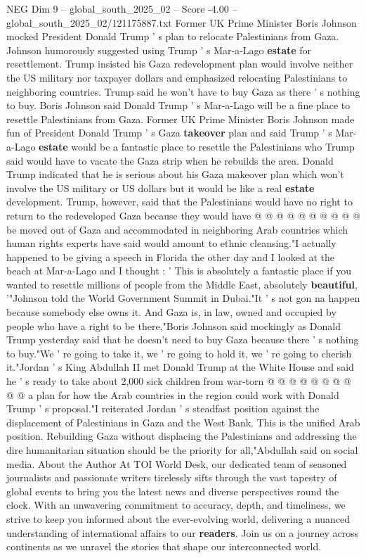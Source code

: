 \begin{textsample}{NEG Dim 9 – global\_south\_2025\_02 – Score -4.00 – global\_south\_2025\_02/121175887.txt}  \label{ex:f9_neg_060}
Former UK Prime Minister Boris Johnson mocked President Donald Trump ' s plan to relocate Palestinians from Gaza.
Johnson humorously suggested using Trump ' s Mar-a-Lago \textbf{estate} for resettlement.
Trump insisted his Gaza redevelopment plan would involve neither the US military nor taxpayer dollars and emphasized relocating Palestinians to neighboring countries.
Trump said he won't have to buy Gaza as there ' s nothing to buy.
Boris Johnson said Donald Trump ' s Mar-a-Lago will be a fine place to resettle Palestinians from Gaza.
Former UK Prime Minister Boris Johnson made fun of President Donald Trump ' s Gaza \textbf{takeover} plan and said Trump ' s Mar-a-Lago \textbf{estate} would be a fantastic place to resettle the Palestinians who Trump said would have to vacate the Gaza strip when he rebuilds the area.
Donald Trump indicated that he is serious about his Gaza makeover plan which won't involve the US military or US dollars but it would be like a real \textbf{estate} development.
Trump, however, said that the Palestinians would have no right to return to the redeveloped Gaza because they would have @ @ @ @ @ @ @ @ @ @ be moved out of Gaza and accommodated in neighboring Arab countries which human rights experts have said would amount to ethnic cleansing."I actually happened to be giving a speech in Florida the other day and I looked at the beach at Mar-a-Lago and I thought : ' This is absolutely a fantastic place if you wanted to resettle millions of people from the Middle East, absolutely \textbf{beautiful}, '"Johnson told the World Government Summit in Dubai."It ' s not gon na happen because somebody else owns it.
And Gaza is, in law, owned and occupied by people who have a right to be there,"Boris Johnson said mockingly as Donald Trump yesterday said that he doesn't need to buy Gaza because there ' s nothing to buy."We ' re going to take it, we ' re going to hold it, we ' re going to cherish it."Jordan ' s King Abdullah II met Donald Trump at the White House and said he ' s ready to take about 2,000 sick children from war-torn @ @ @ @ @ @ @ @ @ @ a plan for how the Arab countries in the region could work with Donald Trump ' s proposal."I reiterated Jordan ' s steadfast position against the displacement of Palestinians in Gaza and the West Bank.
This is the unified Arab position.
Rebuilding Gaza without displacing the Palestinians and addressing the dire humanitarian situation should be the priority for all,"Abdullah said on social media.
About the Author At TOI World Desk, our dedicated team of seasoned journalists and passionate writers tirelessly sifts through the vast tapestry of global events to bring you the latest news and diverse perspectives round the clock.
With an unwavering commitment to accuracy, depth, and timeliness, we strive to keep you informed about the ever-evolving world, delivering a nuanced understanding of international affairs to our \textbf{readers}.
Join us on a journey across continents as we unravel the stories that shape our interconnected world.

\end{textsample}
